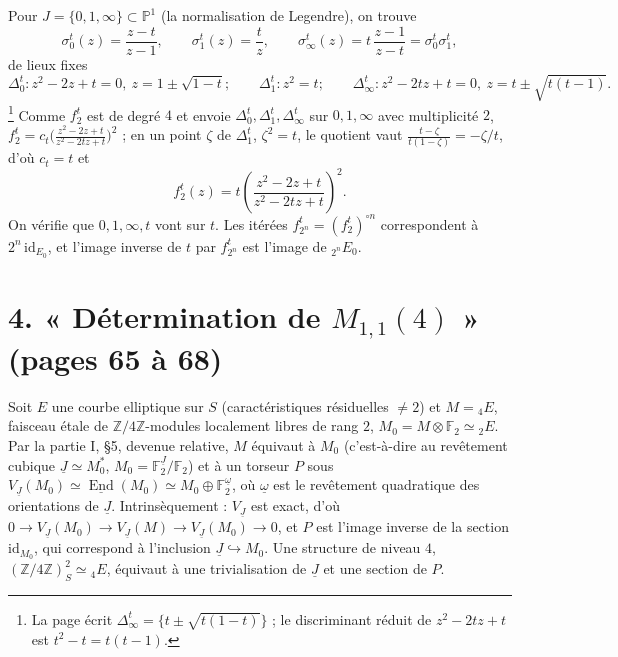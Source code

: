\documentclass[11pt,a4paper]{article}
\begin{document}
Pour $J = \{0, 1, \infty\} \subset \mathbb{P}^1$ (la normalisation de
Legendre), on trouve
\[
\sigma^t_0(z) = \frac{z - t}{z - 1}, \qquad \sigma^t_1(z) = \frac{t}{z}, \qquad
\sigma^t_\infty(z) = t\, \frac{z - 1}{z - t} = \sigma^t_0 \sigma^t_1,
\]
de lieux fixes
\[
\Delta^t_0 : z^2 - 2z + t = 0, \ z = 1 \pm \sqrt{1 - t} ; \qquad \Delta^t_1 :
z^2 = t ; \qquad \Delta^t_\infty : z^2 - 2tz + t = 0, \ z = t \pm \sqrt{t(t - 1)}.
\]
\footnote{La page écrit $\Delta^t_\infty = \{t \pm \sqrt{t(1 - t)}\}$ ; le
discriminant réduit de $z^2 - 2tz + t$ est $t^2 - t = t(t - 1)$.} Comme $f^t_2$
est de degré $4$ et envoie $\Delta^t_0, \Delta^t_1, \Delta^t_\infty$ sur $0, 1,
\infty$ avec multiplicité $2$, $f^t_2 = c_t \bigl(\frac{z^2 - 2z + t}{z^2 - 2tz
+ t}\bigr)^2$ ; en un point $\zeta$ de $\Delta^t_1$, $\zeta^2 = t$, le quotient
vaut $\frac{t - \zeta}{t(1 - \zeta)} = -\zeta/t$, d'où $c_t = t$ et
\[
f^t_2(z) = t \left( \frac{z^2 - 2z + t}{z^2 - 2tz + t} \right)^2 .
\]
On vérifie que $0, 1, \infty, t$ vont sur $t$. Les itérées $f^t_{2^n} =
(f^t_2)^{\circ n}$ correspondent à $2^n\,\mathrm{id}_{E_0}$, et l'image inverse
de $t$ par $f^t_{2^n}$ est l'image de ${}_{2^n}E_0$.

\section*{4. « Détermination de $M_{1,1}(4)$ » (pages 65 à 68)}

Soit $E$ une courbe elliptique sur $S$ (caractéristiques résiduelles $\neq 2$)
et $M = {}_4E$, faisceau étale de $\mathbb{Z}/4\mathbb{Z}$-modules localement
libres de rang $2$, $M_0 = M \otimes \mathbb{F}_2 \simeq {}_2E$. Par la partie
I, §5, devenue relative, $M$ équivaut à $M_0$ (c'est-à-dire au revêtement
cubique $\underline{J} \simeq M_0^{*}$, $M_0 = \mathbb{F}_2^{\underline{J}} /
\mathbb{F}_2$) et à un torseur $P$ sous $V_{\underline{J}}(M_0) \simeq
\underline{\operatorname{End}}(M_0) \simeq M_0 \oplus
\mathbb{F}_2^{\underline{\omega}}$, où $\underline{\omega}$ est le revêtement
quadratique des orientations de $\underline{J}$. Intrinsèquement :
$V_{\underline{J}}$ est exact, d'où $0 \to V_{\underline{J}}(M_0) \to
V_{\underline{J}}(M) \to V_{\underline{J}}(M_0) \to 0$, et $P$ est l'image
inverse de la section $\mathrm{id}_{M_0}$, qui correspond à l'inclusion
$\underline{J} \hookrightarrow M_0$. Une structure de niveau $4$,
$(\mathbb{Z}/4\mathbb{Z})^2_S \simeq {}_4E$, équivaut à une trivialisation de
$\underline{J}$ et une section de $P$.
\end{document}
